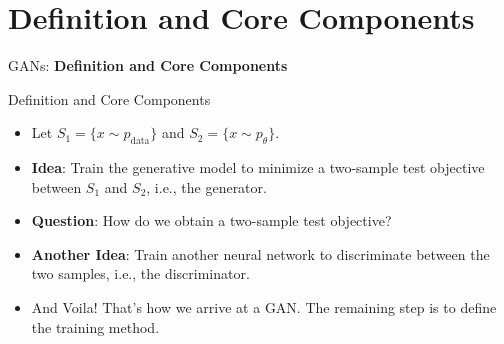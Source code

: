 \section{Definition and Core Components}
\begin{frame}{}
    \LARGE GANs: \textbf{Definition and Core Components}
\end{frame}

\begin{frame}{Definition and Core Components}
\begin{itemize}
    \item Let $S_1 = \{x \sim p_{\text{data}}\}$ and $S_2 = \{x \sim p_\theta\}$.
    \item \textbf{Idea}: Train the generative model to minimize a two-sample test objective between $S_1$ and $S_2$, i.e., the generator.
    \item<2-> \textbf{Question}: How do we obtain a two-sample test objective?
    \item<3-> \textbf{Another Idea}: Train another neural network to discriminate between the two samples, i.e., the discriminator.
    \item<4-> And Voila! That's how we arrive at a GAN. The remaining step is to define the training method.
\end{itemize}
\end{frame}

